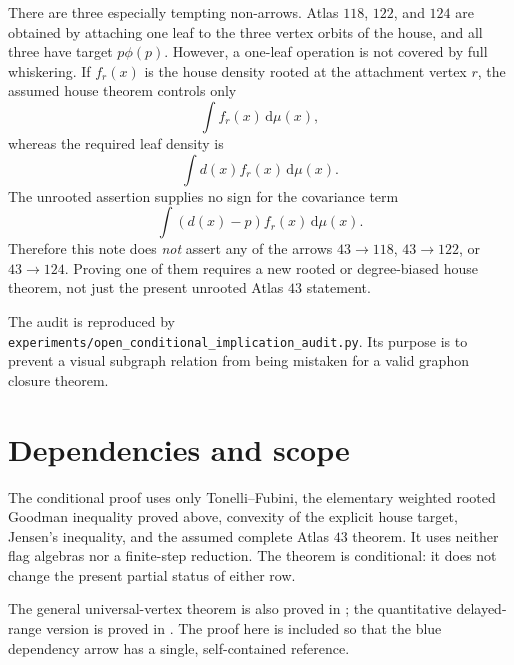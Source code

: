 \documentclass[11pt]{article}
\newcommand{\dd}{\,\mathrm d}
\begin{document}
There are three especially tempting non-arrows.  Atlas $118$, $122$, and
$124$ are obtained by attaching one leaf to the three vertex orbits of the
house, and all three have target $p\phi(p)$.  However, a one-leaf operation
is not covered by full whiskering.  If $f_r(x)$ is the house density rooted
at the attachment vertex $r$, the assumed house theorem controls only
\[
 \int f_r(x)\dd\mu(x),
\]
whereas the required leaf density is
\[
 \int d(x)f_r(x)\dd\mu(x).
\]
The unrooted assertion supplies no sign for the covariance term
\[
 \int (d(x)-p)f_r(x)\dd\mu(x).
\]
Therefore this note does \emph{not} assert any of the arrows
$43\to118$, $43\to122$, or $43\to124$.  Proving one of them requires a
new rooted or degree-biased house theorem, not just the present unrooted
Atlas $43$ statement.

The audit is reproduced by
\texttt{experiments/open\_conditional\_implication\_audit.py}.  Its purpose
is to prevent a visual subgraph relation from being mistaken for a valid
graphon closure theorem.

\section{Dependencies and scope}

The conditional proof uses only Tonelli--Fubini, the elementary weighted
rooted Goodman inequality proved above, convexity of the explicit house
target, Jensen's inequality, and the assumed complete Atlas $43$ theorem.
It uses neither flag algebras nor a finite-step reduction.  The theorem is
conditional: it does not change the present partial status of either row.

The general universal-vertex theorem is also proved in
; the quantitative delayed-range
version is proved in
.  The proof here is
included so that the blue dependency arrow has a single, self-contained
reference.
\end{document}
